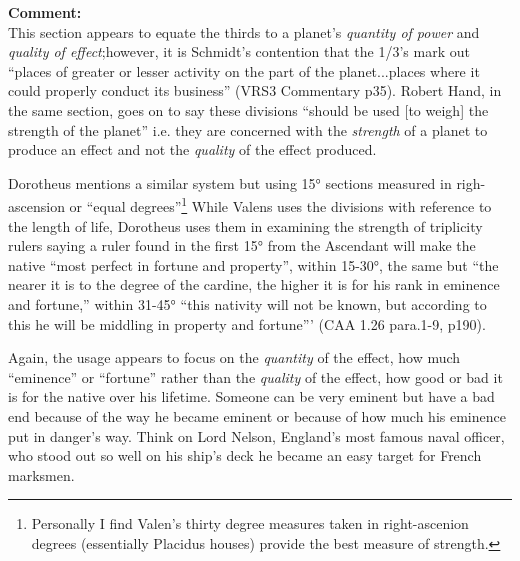 \begin{mdframed}[backgroundcolor=cyan!5]
\small
\textbf{Comment:} \hfill \\
This section appears to equate the thirds to a planet's \textsl{quantity of power} and \textsl{quality of effect};however, it is Schmidt's contention that the 1/3's mark out ``places of greater or lesser activity on the part of the planet...places where it could properly conduct its business'' (VRS3 Commentary p35). Robert Hand, in the same section, goes on to say these divisions ``should be used [to weigh] the strength of the planet'' i.e. they are concerned with the \textsl{strength} of a planet to produce an effect and not the \textsl{quality} of the effect produced.

Dorotheus mentions a similar system but using 15° sections measured in righ-ascension or ``equal degrees''\footnote{\tiny Personally I find Valen's thirty degree measures taken in right-ascenion degrees (essentially Placidus houses) provide the best measure of strength.} While Valens uses the divisions with reference to the length of life, Dorotheus uses them in examining the strength of triplicity rulers saying a ruler found in the first 15° from the Ascendant will make the native ``most perfect in fortune and property'', within 15-30°, the same but ``the nearer it is to the degree of the cardine, the higher it is for his rank in eminence and fortune,'' within 31-45° ``this nativity will not be known, but according to this he will be middling in property and fortune'''  (CAA 1.26 para.1-9, p190). 

Again, the usage appears to focus on the \textsl{quantity} of the effect, how much ``eminence'' or ``fortune'' rather than the \textsl{quality} of the effect, how good or bad it is for the native over his lifetime. Someone can be very eminent but have a bad end because of the way he became eminent or because of how much his eminence put in danger's way. Think on Lord Nelson, England's most famous naval officer, who stood out so well on his ship's deck he became an easy target for French marksmen.
\end{mdframed}

\newpage